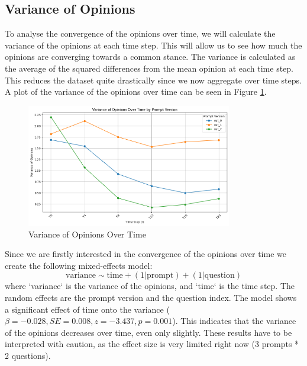 \documentclass[12pt]{article}
\begin{document}
\subsection{Variance of Opinions}
To analyse the convergence of the opinions over time, we will calculate the variance of the opinions at each time step. This will allow us to see how much the opinions are converging towards a common stance. The variance is calculated as the average of the squared differences from the mean opinion at each time step. This reduces the dataset quite drastically since we now aggregate over time steps. A plot of the variance of the opinions over time can be seen in Figure \ref{fig:variance_of_opinions}. 


\begin{figure}[h]
\centering
\includegraphics[width=0.8\textwidth]{img/variance_of_opinions.png}
\caption{Variance of Opinions Over Time}
\label{fig:variance_of_opinions}
\end{figure}

Since we are firstly interested in the convergence of the opinions over time we create the following mixed-effects model:
\begin{equation}
    \text{variance} \sim \text{time} + (1 | \text{prompt}) + (1 | \text{question})
\end{equation}
where `variance` is the variance of the opinions, and `time` is the time step. The random effects are the prompt version and the question index. The model shows a significant effect of time onto the variance ($\beta = -0.028, SE = 0.008, z = -3.437, p = 0.001$). This indicates that the variance of the opinions decreases over time, even only slightly. These results have to be interpreted with caution, as the effect size is very limited right now (3 prompts * 2 questions).




\end{document}
